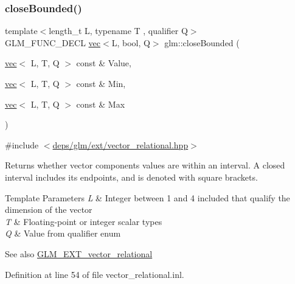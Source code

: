 \subsubsection{\texorpdfstring{close\+Bounded()}{closeBounded()}}
{\footnotesize\ttfamily template$<$length\+\_\+t L, typename T , qualifier Q$>$ \\
G\+L\+M\+\_\+\+F\+U\+N\+C\+\_\+\+D\+E\+CL \hyperlink{structglm_1_1vec}{vec}$<$L, bool, Q$>$ glm\+::close\+Bounded (\begin{DoxyParamCaption}\item[{\hyperlink{structglm_1_1vec}{vec}$<$ L, T, Q $>$ const \&}]{Value,  }\item[{\hyperlink{structglm_1_1vec}{vec}$<$ L, T, Q $>$ const \&}]{Min,  }\item[{\hyperlink{structglm_1_1vec}{vec}$<$ L, T, Q $>$ const \&}]{Max }\end{DoxyParamCaption})}



{\ttfamily \#include $<$\hyperlink{ext_2vector__relational_8hpp}{deps/glm/ext/vector\+\_\+relational.\+hpp}$>$}

Returns whether vector components values are within an interval. A closed interval includes its endpoints, and is denoted with square brackets.


\begin{DoxyTemplParams}{Template Parameters}
{\em L} & Integer between 1 and 4 included that qualify the dimension of the vector \\
\hline
{\em T} & Floating-\/point or integer scalar types \\
\hline
{\em Q} & Value from qualifier enum\\
\hline
\end{DoxyTemplParams}
\begin{DoxySeeAlso}{See also}
\hyperlink{group__ext__vector__relational}{G\+L\+M\+\_\+\+E\+X\+T\+\_\+vector\+\_\+relational} 
\end{DoxySeeAlso}


Definition at line 54 of file vector\+\_\+relational.\+inl.

\mbox{\label{group__ext__vector__relational_gae630b1f87fbd3b762ca46b0b8b32b02e}} 
